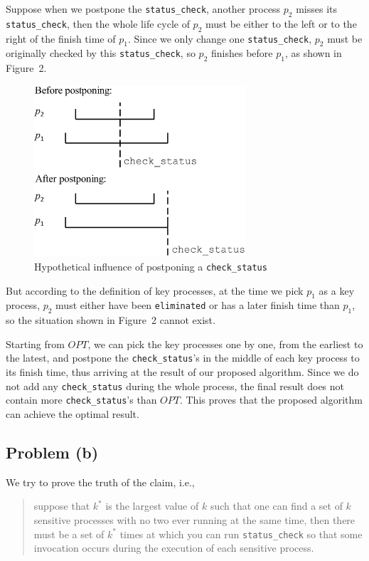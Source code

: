 \documentclass[12pt,letterpaper]{article}
\begin{document}
Suppose when we postpone the \texttt{status\_check}, another process $p_2$ misses its \texttt{status\_check}, then the whole life cycle of $p_2$ must be either to the left or to the right of the finish time of $p_1$. Since we only change one \texttt{status\_check}, $p_2$ must be originally checked by this \texttt{status\_check}, so $p_2$ finishes before $p_1$, as shown in Figure~2.

\begin{figure}
\begin{center}
\includegraphics[width=0.7\textwidth]{4.14.eps}
\caption{Hypothetical influence of postponing a \texttt{check\_status}}
\end{center}
\end{figure}

But according to the definition of key processes, at the time we pick $p_1$ as a key process, $p_2$ must either have been \texttt{eliminated} or has a later finish time than $p_1$, so the situation shown in Figure~2 cannot exist.

Starting from $OPT$, we can pick the key processes one by one, from the earliest to the latest, and postpone the \texttt{check\_status}'s in the middle of each key process to its finish time, thus arriving at the result of our proposed algorithm. Since we do not add any \texttt{check\_status} during the whole process, the final result does not contain more \texttt{check\_status}'s than $OPT$. This proves that the proposed algorithm can achieve the optimal result.

\subsection*{Problem (b)}
We try to prove the truth of the claim, i.e., 
\begin{quote}
suppose that $k^*$ is the largest
value of $k$ such that one can find a set of $k$ sensitive processes with
no two ever running at the same time, then there must
be a set of $k^*$ times at which you can run \texttt{status\_check} so that some
invocation occurs during the execution of each sensitive process. 
\end{quote}
\end{document}

